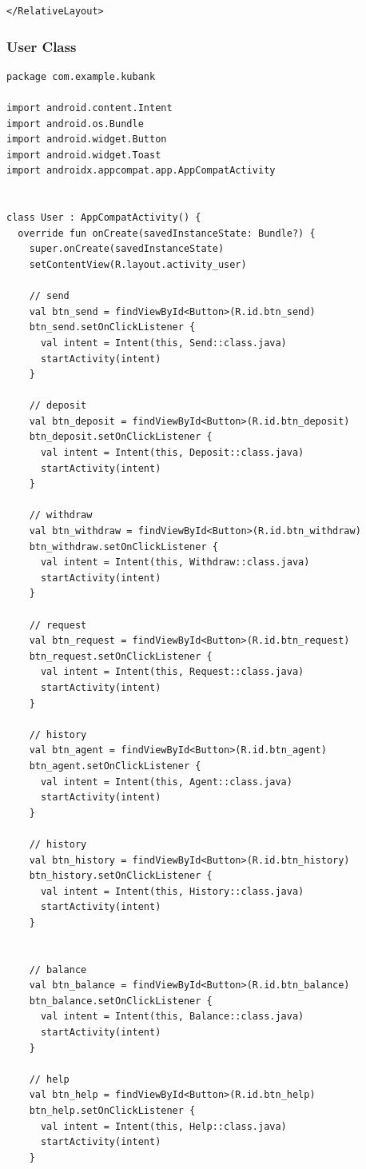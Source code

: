 \documentclass[11pt, a4paper]{article}
\begin{document}
\begin{appendices}
\begin{lstlisting}
</RelativeLayout>
\end{lstlisting}
\subsubsection{User Class}
\begin{lstlisting}
package com.example.kubank

import android.content.Intent
import android.os.Bundle
import android.widget.Button
import android.widget.Toast
import androidx.appcompat.app.AppCompatActivity


class User : AppCompatActivity() {
  override fun onCreate(savedInstanceState: Bundle?) {
    super.onCreate(savedInstanceState)
    setContentView(R.layout.activity_user)

    // send
    val btn_send = findViewById<Button>(R.id.btn_send)
    btn_send.setOnClickListener {
      val intent = Intent(this, Send::class.java)
      startActivity(intent)
    }

    // deposit
    val btn_deposit = findViewById<Button>(R.id.btn_deposit)
    btn_deposit.setOnClickListener {
      val intent = Intent(this, Deposit::class.java)
      startActivity(intent)
    }

    // withdraw
    val btn_withdraw = findViewById<Button>(R.id.btn_withdraw)
    btn_withdraw.setOnClickListener {
      val intent = Intent(this, Withdraw::class.java)
      startActivity(intent)
    }

    // request
    val btn_request = findViewById<Button>(R.id.btn_request)
    btn_request.setOnClickListener {
      val intent = Intent(this, Request::class.java)
      startActivity(intent)
    }

    // history
    val btn_agent = findViewById<Button>(R.id.btn_agent)
    btn_agent.setOnClickListener {
      val intent = Intent(this, Agent::class.java)
      startActivity(intent)
    }

    // history
    val btn_history = findViewById<Button>(R.id.btn_history)
    btn_history.setOnClickListener {
      val intent = Intent(this, History::class.java)
      startActivity(intent)
    }


    // balance
    val btn_balance = findViewById<Button>(R.id.btn_balance)
    btn_balance.setOnClickListener {
      val intent = Intent(this, Balance::class.java)
      startActivity(intent)
    }

    // help
    val btn_help = findViewById<Button>(R.id.btn_help)
    btn_help.setOnClickListener {
      val intent = Intent(this, Help::class.java)
      startActivity(intent)
    }


\end{lstlisting}
\end{appendices}
\end{document}
